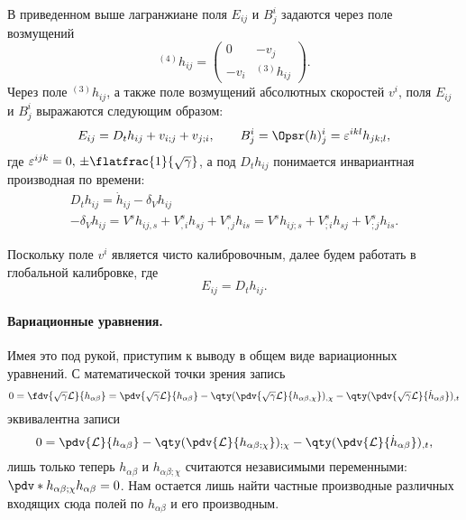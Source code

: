 \documentclass[\docroot/reports/draft/report.tex]{subfiles}
\begin{document}
    В приведенном выше лагранжиане поля $E_{ij}$ и $B^i_j$ задаются через поле возмущений
    \begin{equation}
        {}^{(4)}h_{ij} = \begin{pmatrix}
            0    & - v_j          \\
            -v_i & {}^{(3)}h_{ij}
        \end{pmatrix} .
    \end{equation}
    Через поле ${}^{(3)}h_{ij}$, а также поле возмущений абсолютных скоростей $v^i$, поля $E_{ij}$ и $B^i_j$ выражаются следующим образом:
    \begin{equation}
        E_{ij} = D_t{h}_{ij} + v_{i;j} + v_{j;i}, \qquad
        B^i_j = \Opsr(h)^i_j = \varepsilon^{ikl} h_{jk;l} ,
    \end{equation}
    где $\varepsilon^{ijk} = 0,\, \pm \flatfrac{1}{\sqrt{\gamma}}$, а под $D_t{h}_{ij}$ понимается инвариантная производная по времени:
    \begin{gather}
        D_t{h}_{ij} =
            \dot{h}_{ij} - \delta_{V} h_{ij}\\
        -\delta_{V} h_{ij} =
            V^s h_{ij,s} + V^s_{,i} h_{sj} + V^s_{,j} h_{is} =
            V^s h_{ij;s} + V^s_{;i} h_{sj} + V^s_{;j} h_{is} .
    \end{gather}

    Поскольку поле $v^i$ является чисто калибровочным, далее будем работать в глобальной калибровке, где
    \begin{equation}
        E_{ij} = D_t{h}_{ij} .
    \end{equation}

    \paragraph{Вариационные уравнения.}

    Имея это под рукой, приступим к выводу в общем виде вариационных уравнений. С математической точки зрения запись
    \begin{equation*}
        0 = \fdv{\sqrt{\gamma}\mathcal{L}}{h_{\alpha\beta}} =
            \pdv{\sqrt{\gamma}\mathcal{L}}{h_{\alpha\beta}} -
            \qty(\pdv{\sqrt{\gamma}\mathcal{L}}{h_{\alpha\beta,\chi}})_{,\chi} -
            \qty(\pdv{\sqrt{\gamma}\mathcal{L}}{\dot{h}_{\alpha\beta}})_{,t}
    \end{equation*}
    эквивалентна записи
    \begin{equation*}
        0 =
            \pdv{\mathcal{L}}{h_{\alpha\beta}} -
            \qty(\pdv{\mathcal{L}}{h_{\alpha\beta;\chi}})_{;\chi} -
            \qty(\pdv{\mathcal{L}}{\dot{h}_{\alpha\beta}})_{,t} ,
    \end{equation*}
    лишь только теперь $h_{\alpha\beta}$ и $h_{\alpha\beta;\chi}$ считаются независимыми переменными: $\pdv*{h_{\alpha\beta;\chi}}{h_{\alpha\beta}} = 0$. Нам остается лишь найти частные производные различных входящих сюда полей по $h_{\alpha\beta}$ и его производным.
\end{document}
